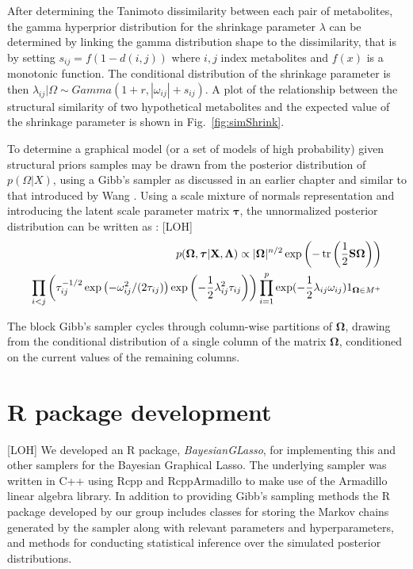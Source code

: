 After determining the Tanimoto dissimilarity between each pair of metabolites, the gamma hyperprior distribution for the shrinkage parameter $\lambda$ can be determined by linking the gamma distribution shape to the dissimilarity, that is by setting $s_{ij}=f(1-d(i,j))$ where $i,j$ index metabolites and $f(x)$ is a monotonic function. The conditional distribution of the shrinkage parameter is then $\lambda_{ij} |\Omega \sim Gamma(1+r,|\omega_{ij} |+s_{ij} )$. A plot of the relationship between the structural similarity of two hypothetical metabolites and the expected value of the shrinkage parameter is shown in  Fig.~\ref{fig:simShrink}. 

To determine a graphical model (or a set of models of high probability) given structural priors samples may be drawn from the posterior distribution of $p(\Omega|X)$, using a Gibb’s sampler as discussed in an earlier chapter and similar to that introduced by Wang \cite{wang2012}. Using a scale mixture of normals representation  \cite{west1987} and introducing the latent scale parameter matrix $\boldsymbol{\tau}$, the unnormalized posterior distribution can be written as \cite{wang2012}: [LOH]
\begin{align}
\begin{split}
	p(\boldsymbol{\Omega}, \boldsymbol{\tau}|\textbf{X}, \boldsymbol{\Lambda}) \propto |\boldsymbol{\Omega}| ^{n/2} \exp \left(-\operatorname{tr} \left(\frac{1}{2}\textbf{S}\boldsymbol{\Omega} \right) \right)\\ \prod_{i<j} \left(\tau_{ij}^{-1/2} \exp \left(-\omega_{ij}^2 / (2\tau_{ij}) \right) \exp \left(-\frac{1}{2} \lambda_{ij}^2 \tau_{ij}\right)\right)  \prod_{i=1}^{p} \exp(-\frac{1}{2} \lambda_{ij} \omega_{ij}) 1_{\boldsymbol{\Omega}\in M^+}
\end{split}
\end{align}

The block Gibb’s sampler cycles through column-wise partitions of $\boldsymbol{\Omega}$, drawing from the conditional distribution of a single column of the matrix $\boldsymbol{\Omega}$, conditioned on the current values of the remaining columns.

\section{R package development} [LOH]
 We developed an R package, \emph{BayesianGLasso}, for implementing this and other samplers for the Bayesian Graphical Lasso. The underlying sampler was written in C++ using Rcpp and RcppArmadillo to make use of the Armadillo linear algebra library. In addition to providing Gibb’s sampling methods the R package developed by our group includes classes for storing the Markov chains generated by the sampler along with relevant parameters and hyperparameters, and methods for conducting statistical inference over the simulated posterior distributions.

